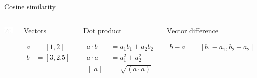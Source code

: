 \documentclass[
  10pt,
  ignorenonframetext,
  x11names, dvipsnames, bibspacing,natbib, table]{beamer}
\begin{document}
\begin{frame}{Cosine similarity}
\protect\hypertarget{cosine-similarity-1}{}
\begin{columns}
    

\begin{center}\includegraphics[width=1\linewidth]{presentationBoston_files/figure-beamer/cosine2-1} \end{center}



\footnotesize 


\begin{block}{Vectors}

\begin{align*}
a  & = [1,2]\\
b  &= [3,2.5]
\end{align*}

\end{block}


\begin{block}{Dot product}

\begin{align*}
a \cdot b & = a_1 b_1 + a_2 b_2\\
a \cdot a & = a_1^2 + a_2 ^ 2 \\
\lVert a\rVert & = \sqrt{(a \cdot a)}
\end{align*}

\end{block}


\begin{block}{Vector difference}

\begin{align*}
b - a & = [b_1- a_1, b_2 - a_2 ]
\end{align*}

\end{block}

\end{columns}
\end{frame}
\end{document}
